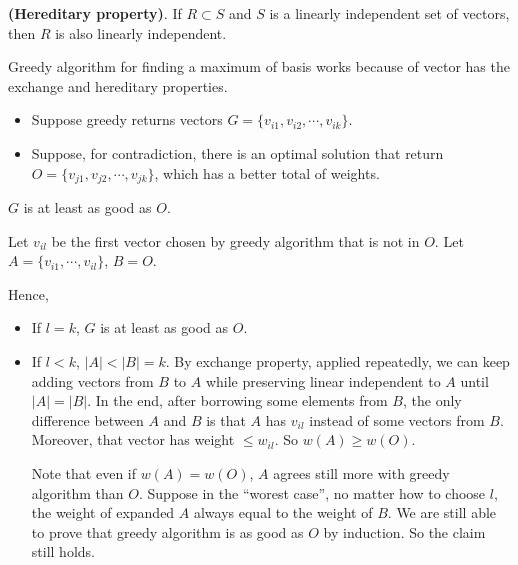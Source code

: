 \begin{theorem}
	\textbf{(Hereditary property)}. If $ R \subset S $ and $S$ is a linearly independent set of vectors, then $R$ is also linearly independent.
\end{theorem}

Greedy algorithm for finding a maximum of basis works because of vector has the exchange and hereditary properties.

\begin{itemize}
	\item Suppose greedy returns vectors $G = \{v_{i1}, v_{i2}, \cdots, v_{ik}\}$.
	\item Suppose, for contradiction, there is an optimal solution that return $O = \{v_{j1}, v_{j2}, \cdots, v_{jk} \}$, which has a better total of weights.
\end{itemize}

\begin{claim}
	$G$ is at least as good as $ O $.
\end{claim}
\begin{claimproof}
	
	Let $ v_{il} $ be the first vector chosen by greedy algorithm that is not in $O$. Let $ A = \{v_{i1}, \cdots, v_{il}\} $, $ B = O$. 
	
	Hence,
	\begin{itemize}
		\item If $ l = k $, $ G $ is at least as good as $ O $.
		\item If $ l < k $, $ |A| < |B| = k $. By exchange property, applied repeatedly, we can keep adding vectors from $ B $ to $ A $ while preserving linear independent to $ A $ until $ |A| = |B| $. In the end, after borrowing some elements from $B$, the only difference between $A$ and $B$ is that $ A $ has $ v_{il} $ instead of some vectors from $B$. Moreover, that vector has weight $ \le w_{il} $. So $ w(A) \ge w(O)$.
		
		Note that even if $ w(A) = w(O) $, $ A $ agrees still more with greedy algorithm than $ O $. Suppose in the ``worest case'', no matter how to choose $l$, the weight of expanded $A$ always equal to the weight of $B$. We are still able to prove that greedy algorithm is as good as $ O $ by induction. So the claim still holds.
	\end{itemize}
	
%	
%	
\end{claimproof}





